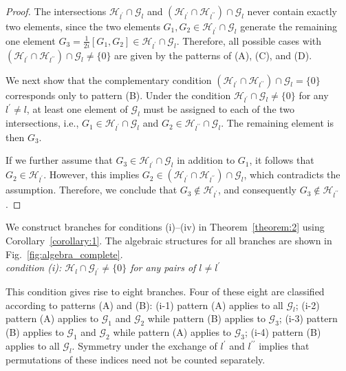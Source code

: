 \documentclass[aps,showpacs,amsmath,amssymb,twocolumn,prx,longbibliography,superscriptaddress,notitlepage,floatfix,10pt]{revtex4-2}
\begin{document}
\begin{proof}

     The intersections $\mathcal{H}_{l^{\prime}}\cap\mathcal{G}_{l}$ and $(\mathcal{H}_{l^{\prime}}\cap\mathcal{H}_{l^{\prime\prime}})\cap\mathcal{G}_{l}$ never contain exactly two elements, since the two elements $G_{1},G_{2}\in\mathcal{H}_{l^{\prime}}\cap\mathcal{G}_{l}$ generate the remaining one element $G_{3}
    =\frac{1}{2i}[G_{1},G_{2}]\in\mathcal{H}_{l^{\prime}}\cap\mathcal{G}_{l}$.
     Therefore, all possible cases with $(\mathcal{H}_{l^{\prime}}\cap\mathcal{H}_{l^{\prime\prime}})\cap\mathcal{G}_{l}\not=\{0\}$ are given by the patterns of (A), (C), and (D).
     
     We next show that the complementary condition $(\mathcal{H}_{l^{\prime}}\cap\mathcal{H}_{l^{\prime\prime}})\cap\mathcal{G}_{l}=\{0\}$ corresponds only to pattern (B). Under the condition $\mathcal{H}_{l^{\prime}}\cap\mathcal{G}_{l}\not=\{0\}$ for any $l^{\prime}\not=l$, at least one element of $\mathcal{G}_{l}$ must be assigned to each of the two intersections, i.e., $G_{1}\in\mathcal{H}_{l^{\prime}}\cap\mathcal{G}_{l}$ and $G_{2}\in\mathcal{H}_{l^{\prime\prime}}\cap\mathcal{G}_{l}$. The remaining element is then $G_{3}$. 

    If we further assume that $G_{3}\in\mathcal{H}_{l^{\prime}}\cap\mathcal{G}_{l}$ in addition to $G_{1}$, it follows that $G_{2}\in\mathcal{H}_{l^{\prime}}$. However, this implies $G_{2}\in(\mathcal{H}_{l^{\prime}}\cap\mathcal{H}_{l^{\prime\prime}})\cap\mathcal{G}_{l}$, which contradicts the assumption. Therefore, we conclude that $G_{3}\not\in\mathcal{H}_{l^{\prime}}$, and consequently $G_{3}\not\in\mathcal{H}_{l^{\prime\prime}}$.
\end{proof}

We construct branches for conditions (i)--(iv) in Theorem~\ref{theorem:2} using Corollary~\ref{corollary:1}.
The algebraic structures for all branches are shown in Fig.~\ref{fig:algebra_complete}.\\

{\it condition (i): $\mathcal{H}_{l}\cap\mathcal{G}_{l^{\prime}}\not=\{0\}$ for any pairs of $l\not=l^{\prime}$}

This condition gives rise to eight branches. 
Four of these eight are classified according to patterns (A) and (B): (i-1) pattern (A) applies to all $\mathcal{G}_{l}$; (i-2) pattern (A) applies to $\mathcal{G}_{1}$ and $\mathcal{G}_{2}$ while pattern (B) applies to $\mathcal{G}_{3}$; (i-3) pattern (B) applies to $\mathcal{G}_{1}$ and $\mathcal{G}_{2}$ while pattern (A) applies to $\mathcal{G}_{3}$; (i-4) pattern (B) applies to all $\mathcal{G}_{l}$. Symmetry under the exchange of $l^{\prime}$ and $l^{\prime\prime}$ implies that permutations of these indices need not be counted separately.
\end{document}
